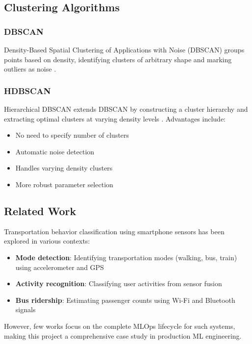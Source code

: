 \subsection{Clustering Algorithms}

\subsubsection{DBSCAN}
Density-Based Spatial Clustering of Applications with Noise (DBSCAN) groups points based on density, identifying clusters of arbitrary shape and marking outliers as noise \cite{ester1996density}.

\subsubsection{HDBSCAN}
Hierarchical DBSCAN extends DBSCAN by constructing a cluster hierarchy and extracting optimal clusters at varying density levels \cite{campello2013density}. Advantages include:
\begin{itemize}
    \item No need to specify number of clusters
    \item Automatic noise detection
    \item Handles varying density clusters
    \item More robust parameter selection
\end{itemize}

\subsection{Related Work}

Transportation behavior classification using smartphone sensors has been explored in various contexts:

\begin{itemize}
    \item \textbf{Mode detection}: Identifying transportation modes (walking, bus, train) using accelerometer and GPS \cite{stenneth2011transportation}
    \item \textbf{Activity recognition}: Classifying user activities from sensor fusion \cite{shoaib2014survey}
    \item \textbf{Bus ridership}: Estimating passenger counts using Wi-Fi and Bluetooth signals \cite{kostakos2009brief}
\end{itemize}

However, few works focus on the complete MLOps lifecycle for such systems, making this project a comprehensive case study in production ML engineering.
